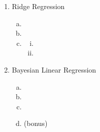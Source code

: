 \documentclass[12pt,twoside]{article}
\begin{document}
\begin{enumerate}[1)]
\item Ridge Regression


\begin{enumerate}[a)]
\item 
\item
\item 

\begin{enumerate}[i)]
\item 
\item
\end{enumerate}

\end{enumerate}

\item Bayesian Linear Regression


\begin{enumerate}[a)]
\addtocounter{enumii}{1} 
\item 
\item
\item 
\item (bonus)
\end{enumerate}

\end{enumerate}
\end{document}

